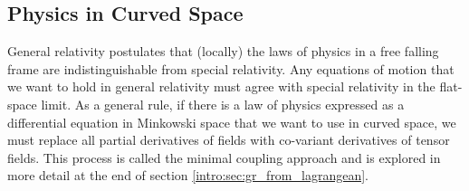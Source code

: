 \subsection{Physics in Curved Space} \label{intro:sec:curvedspacephysics}

General relativity postulates that (locally) the laws of physics in a free falling frame are indistinguishable from special relativity. Any equations of motion that we want to hold in general relativity must agree with special relativity in the flat-space limit. As a general rule, if there is a law of physics expressed as a differential equation in Minkowski space that we want to use in curved space, we must replace all partial derivatives of fields with co-variant derivatives of tensor fields. This process is called the minimal coupling approach and is explored in more detail at the end of section \ref{intro:sec:gr_from_lagrangean}.







